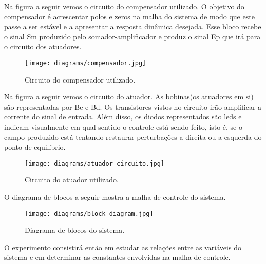 Na figura a seguir vemos o circuito do compensador utilizado. O objetivo do compensador é acrescentar polos e zeros na malha do sistema de modo que este passe a ser estável e a apresentar a resposta dinâmica desejada. Esse bloco recebe o sinal Sm produzido 
pelo somador-amplificador e produz o sinal Ep que irá para o circuito dos atuadores. 
\begin{figure}[H]
\centering
\texttt{[image: diagrams/compensador.jpg]}
\caption{Circuito do compensador utilizado.}
\label{fig:compens}
\end{figure}

Na figura a seguir vemos o circuito do atuador. As bobinas(os atuadores em si) são representadas por Be e Bd. Os transistores vistos no circuito irão amplificar a corrente do sinal de entrada. Além disso, os diodos representados são leds e indicam visualmente em qual sentido o controle está sendo feito, isto é, se o campo produzido está tentando restaurar perturbações a direita ou a esquerda do ponto de equilíbrio.

\begin{figure}[H]
\centering
\texttt{[image: diagrams/atuador-circuito.jpg]}
\caption{Circuito do atuador utilizado.}
\label{fig:atuadorcirc}
\end{figure}

O diagrama de blocos a seguir mostra a malha de controle do sistema.


\FloatBarrier
\begin{figure}[H]
\centering
\texttt{[image: diagrams/block-diagram.jpg]}
\caption{Diagrama de blocos do sistema.}
\label{fig:blk-diag}
\end{figure}
\FloatBarrier

O experimento consistirá então em estudar as relações entre as variáveis do sistema e em determinar as constantes envolvidas na malha de controle.
